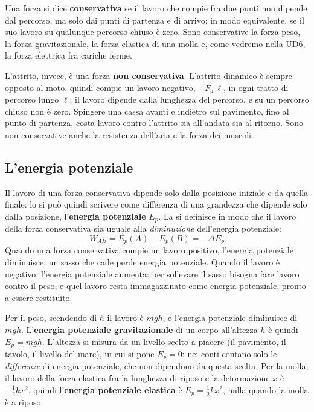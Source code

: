 Una forza si dice \textbf{conservativa} se il lavoro che compie fra due punti non dipende dal percorso, ma solo dai punti di partenza e di arrivo; in modo equivalente, se il suo lavoro su qualunque percorso chiuso è zero. Sono conservative la forza peso, la forza gravitazionale, la forza elastica di una molla e, come vedremo nella UD6, la forza elettrica fra cariche ferme.

L'attrito, invece, è una forza \textbf{non conservativa}. L'attrito dinamico è sempre opposto al moto, quindi compie un lavoro negativo, $-F_d\,\ell$, in ogni tratto di percorso lungo $\ell$; il lavoro dipende dalla lunghezza del percorso, e su un percorso chiuso non è zero. Spingere una cassa avanti e indietro sul pavimento, fino al punto di partenza, costa lavoro contro l'attrito sia all'andata sia al ritorno. Sono non conservative anche la resistenza dell'aria e la forza dei muscoli.

\subsection{L'energia potenziale}

Il lavoro di una forza conservativa dipende solo dalla posizione iniziale e da quella finale: lo si può quindi scrivere come differenza di una grandezza che dipende solo dalla posizione, l'\textbf{energia potenziale} $E_p$. La si definisce in modo che il lavoro della forza conservativa sia uguale alla \emph{diminuzione} dell'energia potenziale:
\[
  W_{AB} = E_{p}(A) - E_{p}(B) = -\Delta E_p
\]
Quando una forza conservativa compie un lavoro positivo, l'energia potenziale diminuisce: un sasso che cade perde energia potenziale. Quando il lavoro è negativo, l'energia potenziale aumenta: per sollevare il sasso bisogna fare lavoro contro il peso, e quel lavoro resta immagazzinato come energia potenziale, pronto a essere restituito.

Per il peso, scendendo di $h$ il lavoro è $mgh$, e l'energia potenziale diminuisce di $mgh$. L'\textbf{energia potenziale gravitazionale} di un corpo all'altezza $h$ è quindi $E_p = mgh$. L'altezza si misura da un livello scelto a piacere (il pavimento, il tavolo, il livello del mare), in cui si pone $E_p = 0$: nei conti contano solo le \emph{differenze} di energia potenziale, che non dipendono da questa scelta. Per la molla, il lavoro della forza elastica fra la lunghezza di riposo e la deformazione $x$ è $-\frac12 kx^2$, quindi l'\textbf{energia potenziale elastica} è $E_p = \frac12 kx^2$, nulla quando la molla è a riposo.


